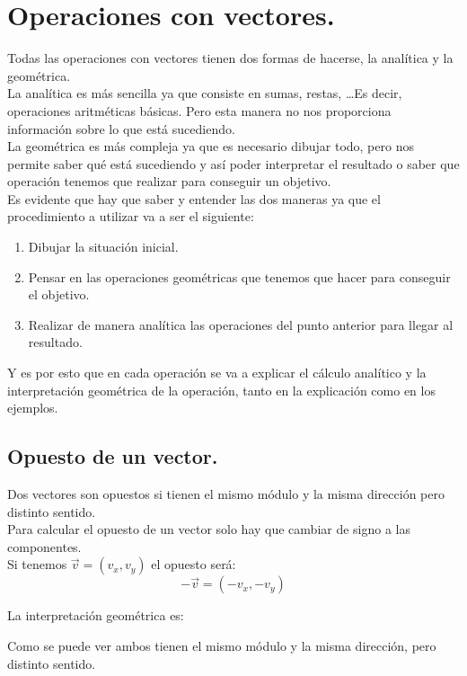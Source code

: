 \documentclass[a4paper,11pt,answers]{exam}
\begin{document}
\section{Operaciones con vectores.}
Todas las operaciones con vectores tienen dos formas de hacerse, la analítica y la geométrica.\\

La analítica es más sencilla ya que consiste en sumas, restas, \dots Es decir, operaciones
aritméticas básicas. Pero esta manera no nos proporciona información sobre lo que está
sucediendo.\\

La geométrica es más compleja ya que es necesario dibujar todo, pero nos permite saber qué está
sucediendo y así poder interpretar el resultado o saber que operación tenemos que realizar
para conseguir un objetivo.\\

Es evidente que hay que saber y entender las dos maneras ya que el procedimiento a utilizar va a
ser el siguiente:
\begin{enumerate}
\item Dibujar la situación inicial.
\item Pensar en las operaciones geométricas que tenemos que hacer para conseguir el
  objetivo.
\item Realizar de manera analítica las operaciones del punto anterior para llegar al resultado.
\end{enumerate}

Y es por esto que en cada operación se va a explicar el cálculo analítico y la interpretación
geométrica de la operación, tanto en la explicación como en los ejemplos.

\subsection{Opuesto de un vector.}
Dos vectores son opuestos si tienen el mismo módulo y la misma dirección pero distinto sentido.\\
Para calcular el opuesto de un vector solo hay que cambiar de signo a las componentes.\\
Si tenemos $\vec{v} =(v_x, v_y)$ el opuesto será:
\[-\vec{v} = (-v_x, -v_y)\]

La interpretación geométrica es:
\begin{center}
\end{center}
Como se puede ver ambos tienen el mismo módulo y la misma dirección, pero distinto sentido.
\end{document}
